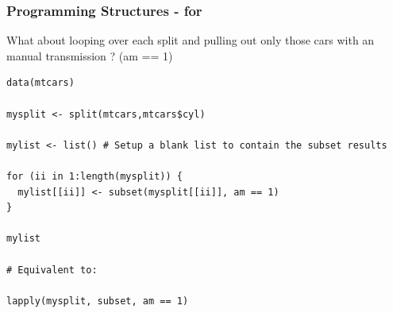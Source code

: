 \documentclass{beamer}
\begin{document}
%

\begin{frame}[fragile]
\frametitle{Programming Structures - for }
What about looping over each split and pulling out only those cars with an manual transmission ? (am == 1) 
\footnotesize
\begin{verbatim}
data(mtcars)

mysplit <- split(mtcars,mtcars$cyl)

mylist <- list() # Setup a blank list to contain the subset results

for (ii in 1:length(mysplit)) {
  mylist[[ii]] <- subset(mysplit[[ii]], am == 1)
}

mylist

# Equivalent to:

lapply(mysplit, subset, am == 1)

\end{verbatim}
\end{frame}

%

%
%
%


%
\end{document}
